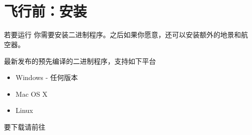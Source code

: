 
\ifchinese
\chapter{{\\}飞行前：安装 \FlightGear{}}
\fi
{}
\label{prefligh}

\ifchinese
若要运行 \FlightGear{} 你需要安装二进制程序。之后如果你愿意，还可以安装额外的地景和航空器。

最新发布的预先编译的二进制程序，支持如下平台

\begin{itemize}
\item Windows - 任何版本
\item Mac OS X
\item Linux
\end{itemize}

要下载请前往

